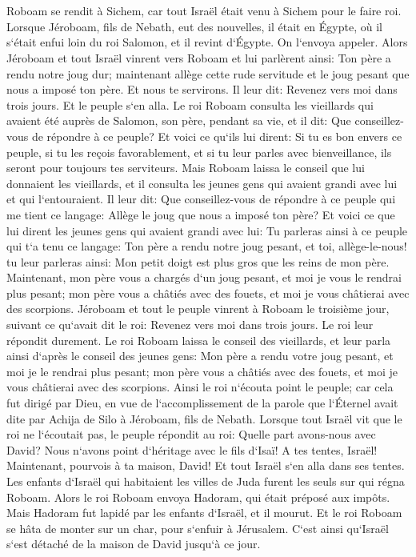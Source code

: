 \chapter{}

\verse Roboam se rendit à Sichem, car tout Israël était venu à Sichem pour le faire roi. 
\verse Lorsque Jéroboam, fils de Nebath, eut des nouvelles, il était en Égypte, où il s`était enfui loin du roi Salomon, et il revint d`Égypte. 
\verse On l`envoya appeler. Alors Jéroboam et tout Israël vinrent vers Roboam et lui parlèrent ainsi: 
\verse Ton père a rendu notre joug dur; maintenant allège cette rude servitude et le joug pesant que nous a imposé ton père. Et nous te servirons. 
\verse Il leur dit: Revenez vers moi dans trois jours. Et le peuple s`en alla. 
\verse Le roi Roboam consulta les vieillards qui avaient été auprès de Salomon, son père, pendant sa vie, et il dit: Que conseillez-vous de répondre à ce peuple? 
\verse Et voici ce qu`ils lui dirent: Si tu es bon envers ce peuple, si tu les reçois favorablement, et si tu leur parles avec bienveillance, ils seront pour toujours tes serviteurs. 
\verse Mais Roboam laissa le conseil que lui donnaient les vieillards, et il consulta les jeunes gens qui avaient grandi avec lui et qui l`entouraient. 
\verse Il leur dit: Que conseillez-vous de répondre à ce peuple qui me tient ce langage: Allège le joug que nous a imposé ton père? 
\verse Et voici ce que lui dirent les jeunes gens qui avaient grandi avec lui: Tu parleras ainsi à ce peuple qui t`a tenu ce langage: Ton père a rendu notre joug pesant, et toi, allège-le-nous! tu leur parleras ainsi: Mon petit doigt est plus gros que les reins de mon père. 
\verse Maintenant, mon père vous a chargés d`un joug pesant, et moi je vous le rendrai plus pesant; mon père vous a châtiés avec des fouets, et moi je vous châtierai avec des scorpions. 
\verse Jéroboam et tout le peuple vinrent à Roboam le troisième jour, suivant ce qu`avait dit le roi: Revenez vers moi dans trois jours. 
\verse Le roi leur répondit durement. Le roi Roboam laissa le conseil des vieillards, 
\verse et leur parla ainsi d`après le conseil des jeunes gens: Mon père a rendu votre joug pesant, et moi je le rendrai plus pesant; mon père vous a châtiés avec des fouets, et moi je vous châtierai avec des scorpions. 
\verse Ainsi le roi n`écouta point le peuple; car cela fut dirigé par Dieu, en vue de l`accomplissement de la parole que l`Éternel avait dite par Achija de Silo à Jéroboam, fils de Nebath. 
\verse Lorsque tout Israël vit que le roi ne l`écoutait pas, le peuple répondit au roi: Quelle part avons-nous avec David? Nous n`avons point d`héritage avec le fils d`Isaï! A tes tentes, Israël! Maintenant, pourvois à ta maison, David! Et tout Israël s`en alla dans ses tentes. 
\verse Les enfants d`Israël qui habitaient les villes de Juda furent les seuls sur qui régna Roboam. 
\verse Alors le roi Roboam envoya Hadoram, qui était préposé aux impôts. Mais Hadoram fut lapidé par les enfants d`Israël, et il mourut. Et le roi Roboam se hâta de monter sur un char, pour s`enfuir à Jérusalem. 
\verse C`est ainsi qu`Israël s`est détaché de la maison de David jusqu`à ce jour. 

